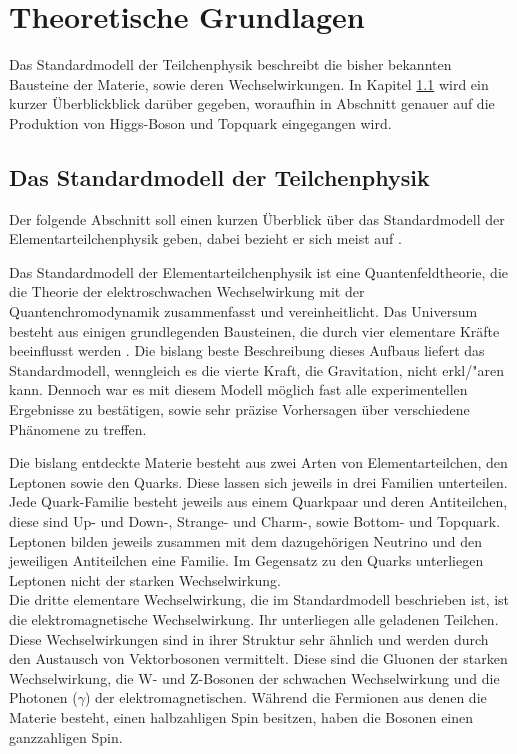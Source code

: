 \chapter{Theoretische Grundlagen}
\label{ch:Theorie}

{}	%

Das Standardmodell der Teilchenphysik beschreibt die bisher bekannten Bausteine der Materie, sowie deren Wechselwirkungen. In Kapitel \ref{ch:Theorie:sec:Standardmodell} wird ein kurzer \"Uberblickblick dar\"uber gegeben, woraufhin in Abschnitt \cite{ch:Theorie:sec:ttH} genauer auf die Produktion von Higgs-Boson und Topquark eingegangen wird.\\


\section{Das Standardmodell der Teilchenphysik}
\label{ch:Theorie:sec:Standardmodell}

Der folgende Abschnitt soll einen kurzen \"Uberblick \"uber das Standardmodell der Elementarteilchenphysik geben, dabei bezieht er sich meist auf \cite{SWB-39819646X}.

Das Standardmodell der Elementarteilchenphysik ist eine Quantenfeldtheorie, die die Theorie der elektroschwachen Wechselwirkung mit der Quantenchromodynamik zusammenfasst und vereinheitlicht. Das Universum besteht aus einigen grundlegenden Bausteinen, die durch vier elementare Kr\"afte beeinflusst werden \cite{O'Luanaigh:1997201}. Die bislang beste Beschreibung dieses Aufbaus liefert das Standardmodell, wenngleich es die vierte Kraft, die Gravitation, nicht erkl/"aren kann. Dennoch war es mit diesem Modell m\"oglich fast alle experimentellen Ergebnisse zu best\"atigen, sowie sehr pr\"azise Vorhersagen \"uber verschiedene Ph\"anomene zu treffen.

Die bislang entdeckte Materie besteht aus zwei Arten von Elementarteilchen, den Leptonen sowie den Quarks. Diese lassen sich jeweils in drei Familien unterteilen. Jede Quark-Familie besteht jeweils aus einem Quarkpaar und deren Antiteilchen, diese sind Up- und Down-, Strange- und Charm-, sowie Bottom- und Topquark.\\
Leptonen bilden jeweils zusammen mit dem dazugeh\"origen Neutrino und den jeweiligen Antiteilchen eine Familie. Im Gegensatz zu den Quarks unterliegen Leptonen nicht der starken Wechselwirkung.\\
Die dritte elementare Wechselwirkung, die im Standardmodell beschrieben ist, ist die elektromagnetische Wechselwirkung. Ihr unterliegen alle geladenen Teilchen. Diese Wechselwirkungen sind in ihrer Struktur sehr \"ahnlich und werden durch den Austausch von Vektorbosonen vermittelt. Diese sind die Gluonen der starken Wechselwirkung, die W- und Z-Bosonen der schwachen Wechselwirkung und die Photonen ($\gamma$) der elektromagnetischen. W\"ahrend die Fermionen aus denen die Materie besteht, einen halbzahligen Spin besitzen, haben die Bosonen einen ganzzahligen Spin.

